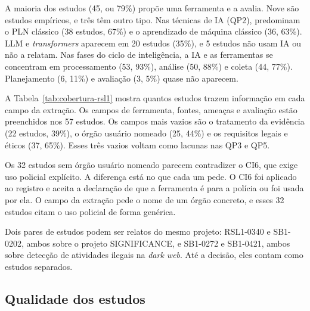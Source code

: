 A maioria dos estudos (45, ou 79\%) propõe uma ferramenta e a avalia. Nove
são estudos empíricos, e três têm outro tipo. Nas técnicas de IA (QP2),
predominam o PLN clássico (38 estudos, 67\%) e o aprendizado de máquina
clássico (36, 63\%). LLM e \textit{transformers} aparecem em 20 estudos
(35\%), e 5 estudos não usam IA ou não a relatam. Nas fases do ciclo de
inteligência, a IA e as ferramentas se concentram em processamento (53, 93\%),
análise (50, 88\%) e coleta (44, 77\%). Planejamento (6, 11\%) e avaliação
(3, 5\%) quase não aparecem.



A Tabela~\ref{tab:cobertura-rsl1} mostra quantos estudos trazem informação em
cada campo da extração. Os campos de ferramenta, fontes, ameaças e avaliação
estão preenchidos nos 57 estudos. Os campos mais vazios são o tratamento da
evidência (22 estudos, 39\%), o órgão usuário nomeado (25, 44\%) e os
requisitos legais e éticos (37, 65\%). Esses três vazios voltam como lacunas
nas QP3 e QP5.



Os 32 estudos sem órgão usuário nomeado parecem contradizer o CI6, que exige
uso policial explícito. A diferença está no que cada um pede. O CI6 foi
aplicado ao registro e aceita a declaração de que a ferramenta é para a
polícia ou foi usada por ela. O campo da extração pede o nome de um órgão
concreto, e esses 32 estudos citam o uso policial de forma genérica.

Dois pares de estudos podem ser relatos do mesmo projeto: RSL1-0340 e
SB1-0202, ambos sobre o projeto SIGNIFICANCE, e SB1-0272 e SB1-0421, ambos
sobre detecção de atividades ilegais na \textit{dark web}. Até a decisão,
eles contam como estudos separados.

\subsection{Qualidade dos estudos}
\label{sec:rsl1-qualidade}

